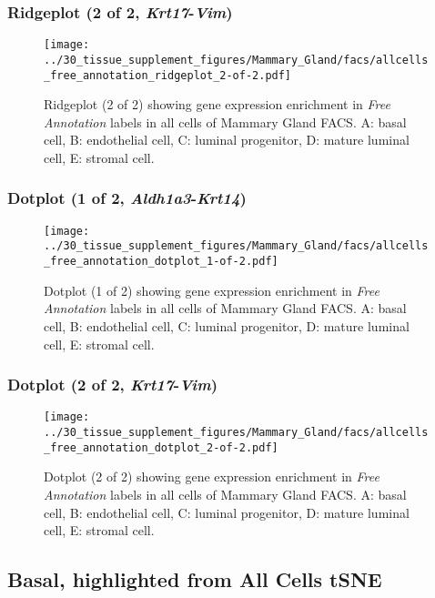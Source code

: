 \clearpage

\subsubsection{Ridgeplot (2 of 2, \emph{Krt17}-\emph{Vim})}
\begin{figure}[h]
\centering
\texttt{[image: ../30\_tissue\_supplement\_figures/Mammary\_Gland/facs/allcells\_free\_annotation\_ridgeplot\_2-of-2.pdf]}

\caption{ Ridgeplot (2 of 2)  showing gene expression enrichment in \emph{Free Annotation} labels in all cells of Mammary Gland FACS. A: basal cell, B: endothelial cell, C: luminal progenitor, D: mature luminal cell, E: stromal cell.}
\end{figure}


\clearpage

\subsubsection{Dotplot (1 of 2, \emph{Aldh1a3}-\emph{Krt14})}
\begin{figure}[h]
\centering
\texttt{[image: ../30\_tissue\_supplement\_figures/Mammary\_Gland/facs/allcells\_free\_annotation\_dotplot\_1-of-2.pdf]}

\caption{ Dotplot (1 of 2)  showing gene expression enrichment in \emph{Free Annotation} labels in all cells of Mammary Gland FACS. A: basal cell, B: endothelial cell, C: luminal progenitor, D: mature luminal cell, E: stromal cell.}
\end{figure}


\clearpage

\subsubsection{Dotplot (2 of 2, \emph{Krt17}-\emph{Vim})}
\begin{figure}[h]
\centering
\texttt{[image: ../30\_tissue\_supplement\_figures/Mammary\_Gland/facs/allcells\_free\_annotation\_dotplot\_2-of-2.pdf]}

\caption{ Dotplot (2 of 2)  showing gene expression enrichment in \emph{Free Annotation} labels in all cells of Mammary Gland FACS. A: basal cell, B: endothelial cell, C: luminal progenitor, D: mature luminal cell, E: stromal cell.}
\end{figure}


\clearpage
\subsection{Basal, highlighted from All Cells tSNE}
